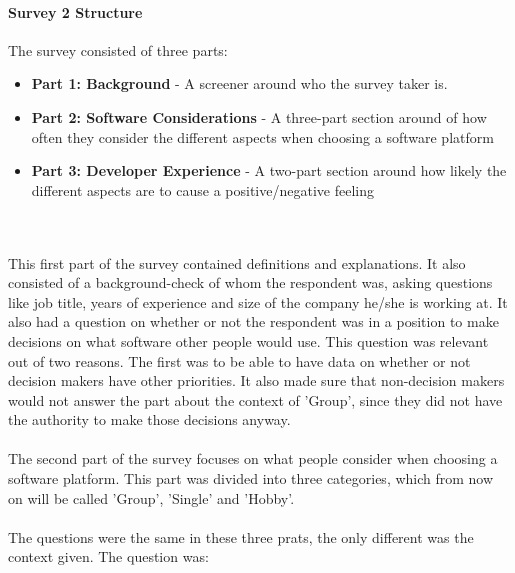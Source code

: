\documentclass{article}
\begin{document}
\paragraph{Survey 2 Structure}

The survey consisted of three parts:
\begin{itemize}[label={}]
\item \textbf{Part 1: Background} - A screener around who the survey taker is.
\item \textbf{Part 2: Software Considerations} - A three-part section around of how often they consider the different aspects when choosing a software platform
\item \textbf{Part 3: Developer Experience} - A two-part section around how likely the different aspects are to cause a positive/negative feeling
\end{itemize}
\\ \\
This first part of the survey contained definitions and explanations. It also consisted of a background-check of whom the respondent was, asking questions like job title, years of experience and size of the company he/she is working at. It also had a question on whether or not the respondent was in a position to make decisions on what software other people would use. This question was relevant out of two reasons. The first was to be able to have data on whether or not decision makers have other priorities. It also made sure that non-decision makers would not answer the part about the context of 'Group', since they did not have the authority to make those decisions anyway.
\\ \\
The second part of the survey focuses on what people consider when choosing a
software platform. This part was divided into three categories, which
from now on will be called 'Group', 'Single' and 'Hobby'.
\\ \\
The questions were the same in these three prats, the only
different was the context given. The question was:
\end{document}
